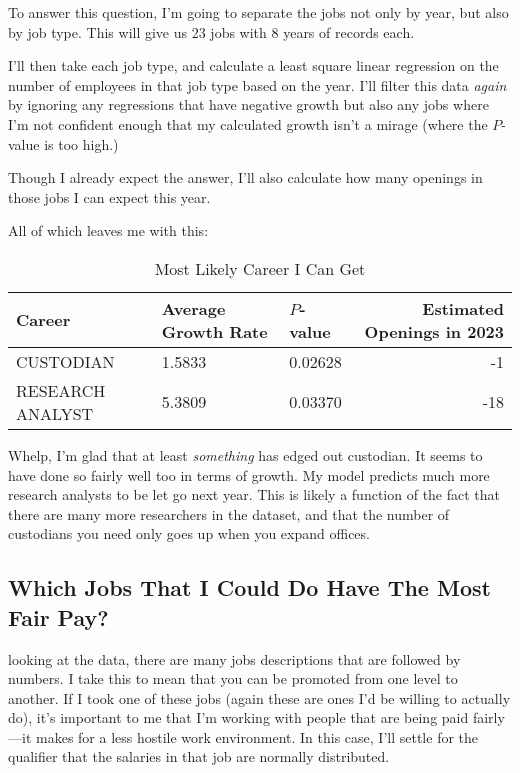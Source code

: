 \documentclass[letterpaper]{article}
\theoremstyle{definition}
\begin{document}
To answer this question, I'm going to separate the jobs not only by year, but also by
job type. This will give us 23 jobs with 8 years of records each.

I'll then take each job type, and calculate a least square linear regression on the number
of employees in that job type based on the year.  I'll filter this data \emph{again} by
ignoring any regressions that have negative growth but also any jobs where I'm not
confident enough that my calculated growth isn't a mirage (where the $P$-value is too
high.)

Though I already expect the answer, I'll also calculate how many openings in those
jobs I can expect this year.

All of which leaves me with this:

\begin{table}[htpb]
	\centering
	\caption{Most Likely Career I Can Get}
	\label{tab:label}
	\begin{tabular}{l|llr}
	  Career  & Average Growth Rate & $P$-value & Estimated Openings in 2023\\
	\hline
		CUSTODIAN         & 1.5833 & 0.02628&  -1\\
		RESEARCH ANALYST  & 5.3809 & 0.03370& -18\\
	
	\end{tabular}
\end{table}

Whelp, I'm glad that at least \emph{something} has edged out custodian. It seems to have
done so fairly well too in terms of growth. My model predicts much more research analysts
to be let go next year. This is likely a function of the fact that there are many more
researchers in the dataset, and that the number of custodians you need only goes up when
you expand offices.

\hypertarget{which-jobs-that-i-could-do-have-the-most-fair-pay}{%
\subsection{Which Jobs That I Could Do Have The Most Fair
Pay?}\label{which-jobs-that-i-could-do-have-the-most-fair-pay}}

looking at the data, there are many jobs descriptions that are followed
by numbers. I take this to mean that you can be promoted from one level
to another. If I took one of these jobs (again these are ones I'd be willing to actually do),
it's important to me that I'm working with people that are being paid
fairly---it makes for a less hostile work environment. In this case,
I'll settle for the qualifier that the salaries in that job are normally
distributed.
\end{document}
